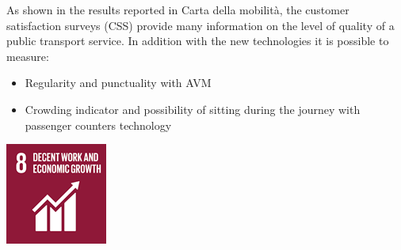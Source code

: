 As shown in the results reported in Carta della mobilità, the customer satisfaction surveys (CSS) provide many information on the level of quality of a public transport service.
In addition with the new technologies it is possible to measure:
\begin{itemize}
    \item Regularity and punctuality with AVM
    \item Crowding indicator and possibility of sitting during the journey with passenger counters technology
\end{itemize}

\begin{minipage}[c]{0.2\textwidth}
    \includegraphics[width=\textwidth]{Images/Social_sustainability/8_work.png}
\end{minipage}
